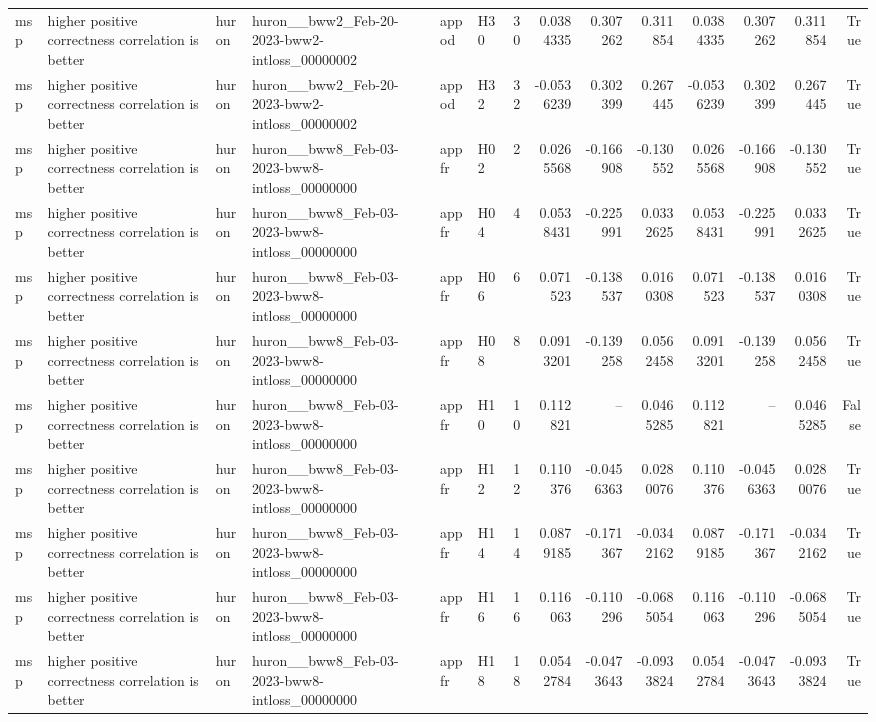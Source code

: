 \begin{longtable}{llllllrrrrrrrr}
msp & higher positive correctness correlation is better & huron & huron\_\_bww2\_Feb-20-2023-bww2-intloss\_00000002 & appod & H30 & 30 & 0.0384335 & 0.307262 & 0.311854 & 0.0384335 & 0.307262 & 0.311854 & True \\
msp & higher positive correctness correlation is better & huron & huron\_\_bww2\_Feb-20-2023-bww2-intloss\_00000002 & appod & H32 & 32 & -0.0536239 & 0.302399 & 0.267445 & -0.0536239 & 0.302399 & 0.267445 & True \\
msp & higher positive correctness correlation is better & huron & huron\_\_bww8\_Feb-03-2023-bww8-intloss\_00000000 & appfr & H02 & 2 & 0.0265568 & -0.166908 & -0.130552 & 0.0265568 & -0.166908 & -0.130552 & True \\
msp & higher positive correctness correlation is better & huron & huron\_\_bww8\_Feb-03-2023-bww8-intloss\_00000000 & appfr & H04 & 4 & 0.0538431 & -0.225991 & 0.0332625 & 0.0538431 & -0.225991 & 0.0332625 & True \\
msp & higher positive correctness correlation is better & huron & huron\_\_bww8\_Feb-03-2023-bww8-intloss\_00000000 & appfr & H06 & 6 & 0.071523 & -0.138537 & 0.0160308 & 0.071523 & -0.138537 & 0.0160308 & True \\
msp & higher positive correctness correlation is better & huron & huron\_\_bww8\_Feb-03-2023-bww8-intloss\_00000000 & appfr & H08 & 8 & 0.0913201 & -0.139258 & 0.0562458 & 0.0913201 & -0.139258 & 0.0562458 & True \\
msp & higher positive correctness correlation is better & huron & huron\_\_bww8\_Feb-03-2023-bww8-intloss\_00000000 & appfr & H10 & 10 & 0.112821 & -- & 0.0465285 & 0.112821 & -- & 0.0465285 & False \\
msp & higher positive correctness correlation is better & huron & huron\_\_bww8\_Feb-03-2023-bww8-intloss\_00000000 & appfr & H12 & 12 & 0.110376 & -0.0456363 & 0.0280076 & 0.110376 & -0.0456363 & 0.0280076 & True \\
msp & higher positive correctness correlation is better & huron & huron\_\_bww8\_Feb-03-2023-bww8-intloss\_00000000 & appfr & H14 & 14 & 0.0879185 & -0.171367 & -0.0342162 & 0.0879185 & -0.171367 & -0.0342162 & True \\
msp & higher positive correctness correlation is better & huron & huron\_\_bww8\_Feb-03-2023-bww8-intloss\_00000000 & appfr & H16 & 16 & 0.116063 & -0.110296 & -0.0685054 & 0.116063 & -0.110296 & -0.0685054 & True \\
msp & higher positive correctness correlation is better & huron & huron\_\_bww8\_Feb-03-2023-bww8-intloss\_00000000 & appfr & H18 & 18 & 0.0542784 & -0.0473643 & -0.0933824 & 0.0542784 & -0.0473643 & -0.0933824 & True \\

\end{longtable}
